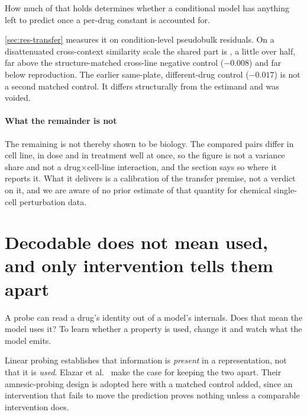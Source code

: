 How much of that holds determines whether a conditional model has anything left
to predict once a per-drug constant is accounted for.

\cref{sec:res-transfer} measures it on condition-level pseudobulk residuals. On a
disattenuated cross-context similarity scale the shared part is
, a little over half, far above the
structure-matched cross-line negative control ($-0.008$) and far below
reproduction. The earlier same-plate, different-drug control ($-0.017$) is not a
second matched control. It differs structurally from the estimand and was
voided.

\paragraph{What the remainder is not} The remaining 
is not thereby shown to be biology. The compared pairs differ in cell line, in
dose and in treatment well at once, so the figure is not a variance share and not
a drug$\times$cell-line interaction, and the section says so where it reports it.
What it delivers is a calibration of the transfer premise, not a verdict on it,
and we are aware of no prior estimate of that quantity for chemical single-cell
perturbation data.

\section{Decodable does not mean used, and only intervention tells them apart}
\label{sec:lit-interp}
\framedecl{-}

\begin{question}
A probe can read a drug's identity out of a model's internals. Does that mean the
model uses it? To learn whether a property is used, change it and watch what the
model emits.
\end{question}

\noindent
Linear probing establishes that information is \emph{present} in a
representation, not that it is \emph{used}. Elazar et al.~\cite{gurnee} make the
case for keeping the two apart. Their amnesic-probing design is adopted here with
a matched control added, since an intervention that fails to move the prediction
proves nothing unless a comparable intervention does.

